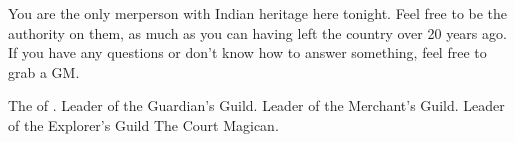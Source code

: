 \documentclass[char]{NeptuneBall}
\begin{document}
\begin{itemz}[Notes]
  \item You are the only merperson with Indian heritage here tonight. Feel free to be the authority on them, as much as you can having left the country over 20 years ago. If you have any questions or don't know how to answer something, feel free to grab a GM.
\end{itemz}


\begin{contacts}
  \contact{\cKing{}} The \cKing{\King} of \pAtlantis{}.
  \contact{\cGeneral{}} Leader of the Guardian's Guild.
  \contact{\cSlave{}} Leader of the Merchant's Guild.
  \contact{\cPriest{}} Leader of the Explorer's Guild
  \contact{\cManta{}} The Court Magican.
\end{contacts}
\end{document}
